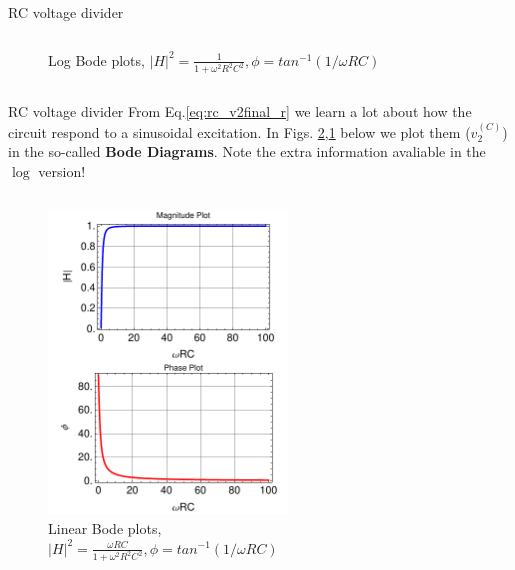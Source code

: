 \begin{frame}{RC voltage divider}
\begin{columns}
\begin{column}{0.5\textwidth}
\begin{figure}
  			\caption{Log Bode plots, $|H|^2=\frac{1}{1+\omega^2 R^2 C^2},\phi=tan^{-1}(1/\omega RC)$}
  			\label{fig:bodepa_log}
			\end{figure}
		\end{column}
	\end{columns}
\end{frame}

\begin{frame}{RC voltage divider}
From Eq.\ref{eq:rc_v2final_r} we learn a lot about how the circuit respond to a sinusoidal excitation. In Figs. \ref{fig:bodepa_lin},\ref{fig:bodepa_log} below we plot them ($v_2^{(C)}$) in the so-called \textbf{Bode Diagrams}. Note the extra information avaliable in the $\log$ version!
	\begin{columns}
		\begin{column}{0.5\textwidth}
			\begin{figure}
  			\includegraphics[width=0.7\textwidth]{bodepa_lin.pdf}
  			\caption{Linear Bode plots, $|H|^2=\frac{\omega R C}{1+\omega^2 R^2 C^2},\phi=tan^{-1}(1/\omega RC)$}
  			\label{fig:bodepa_lin}
			\end{figure}
		\end{column}
		\begin{column}{0.5\textwidth}
			\begin{figure}

\end{figure}
\end{column}
\end{columns}
\end{frame}
